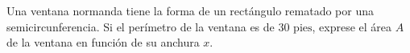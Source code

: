 \item Una ventana normanda tiene la forma de un rectángulo rematado por una semicircunferencia. Si el perímetro de la ventana es de $30\text{ pies}$, exprese el área $A$ de la ventana en función de su anchura $x$.

